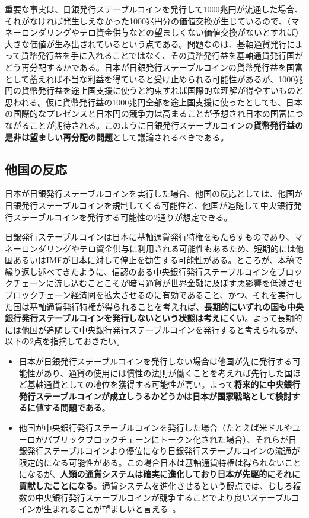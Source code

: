 \documentclass[dvipdfmx,a4paper]{jsarticle}
\begin{document}
重要な事実は、日銀発行ステーブルコインを発行して1000兆円が流通した場合、それがなければ発生しえなかった1000兆円分の価値交換が生じているので、（マネーロンダリングやテロ資金供与などの望ましくない価値交換がないとすれば）大きな価値が生み出されているという点である。問題なのは、基軸通貨発行によって貨幣発行益を手に入れることではなく、その貨幣発行益を基軸通貨発行国がどう再分配するかである。日本が日銀発行ステーブルコインの貨幣発行益を国富として蓄えれば不当な利益を得ていると受け止められる可能性があるが、1000兆円の貨幣発行益を途上国支援に使うと約束すれば国際的な理解が得やすいものと思われる。仮に貨幣発行益の1000兆円全部を途上国支援に使ったとしても、日本の国際的なプレゼンスと日本円の競争力は高まることが予想され日本の国富につながることが期待される。このように日銀発行ステーブルコインの\textbf{貨幣発行益の是非は望ましい再分配の問題}として議論されるべきである。

\subsection{他国の反応}

日本が日銀発行ステーブルコインを実行した場合、他国の反応としては、他国が日銀発行ステーブルコインを規制してくる可能性と、他国が追随して中央銀行発行ステーブルコインを発行する可能性の2通りが想定できる。

日銀発行ステーブルコインは日本に基軸通貨発行特権をもたらすものであり、マネーロンダリングやテロ資金供与に利用される可能性もあるため、短期的には他国あるいはIMFが日本に対して停止を勧告する可能性がある。ところが、本稿で繰り返し述べてきたように、信認のある中央銀行発行ステーブルコインをブロックチェーンに流し込むことこそが暗号通貨が世界金融に及ぼす悪影響を低減させブロックチェーン経済圏を拡大させるのに有効であること、かつ、それを実行した国は基軸通貨発行特権が得られることを考えれば、\textbf{長期的にいずれの国も中央銀行発行ステーブルコインを発行しないという状態は考えにくい}。よって長期的には他国が追随して中央銀行発行ステーブルコインを発行すると考えられるが、以下の2点を指摘しておきたい。

\begin{itemize}
\item 日本が日銀発行ステーブルコインを発行しない場合は他国が先に発行する可能性があり、通貨の使用には慣性の法則が働くことを考えれば先行した国ほど基軸通貨としての地位を獲得する可能性が高い。よって\textbf{将来的に中央銀行発行ステーブルコインが成立しうるかどうかは日本が国家戦略として検討するに値する問題である}。
\item 他国が中央銀行発行ステーブルコインを発行した場合（たとえば米ドルやユーロがパブリックブロックチェーンにトークン化された場合）、それらが日銀発行ステーブルコインより優位になり日銀発行ステーブルコインの流通が限定的になる可能性がある。この場合日本は基軸通貨特権は得られないことになるが、\textbf{人類の通貨システムは確実に進化しており日本が先駆的にそれに貢献したことになる}。通貨システムを進化させるという観点では、むしろ複数の中央銀行発行ステーブルコインが競争することでより良いステーブルコインが生まれることが望ましいと言える~\cite{hayek2009denationalisation}。
\end{itemize}
\end{document}
